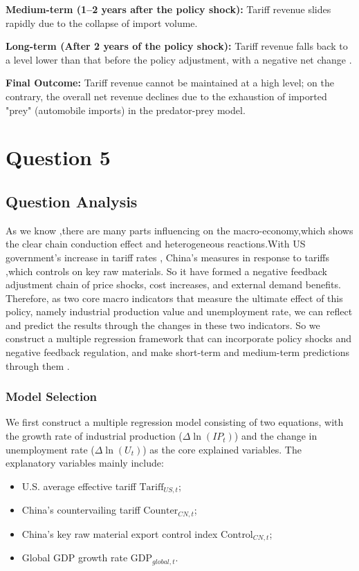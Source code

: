 \documentclass{apmcmthesis}
\begin{document}
\noindent \textbf{Medium-term (1–2 years after the policy shock):} Tariff revenue slides rapidly due to the collapse of import volume.

\noindent \textbf{Long-term (After 2 years of the policy shock):} Tariff revenue falls back to a level lower than that before the policy adjustment, with a negative net change \cite{cbo2025budget}.

\vspace{0.5em}
\noindent \textbf{Final Outcome:} Tariff revenue cannot be maintained at a high level; on the contrary, the overall net revenue declines due to the exhaustion of imported "prey" (automobile imports) in the predator-prey model.
\section{Question 5}
\subsection{Question Analysis}
As we know ,there are many parts influencing on the macro-economy,which shows the clear chain  conduction effect and heterogeneous reactions.With US government's increase in tariff rates , China's  measures in response to tariffs ,which  controls on key raw materials. So it have formed a negative feedback adjustment chain of price shocks, cost increases, and external demand benefits. Therefore, as two core macro indicators that measure the ultimate effect of this policy, namely industrial production value and unemployment rate, we can reflect and predict the results through the changes in these two indicators. So we construct a multiple regression framework that can incorporate policy shocks and negative feedback regulation, and make short-term and medium-term predictions through them \cite{imf2025weo}.

\subsubsection{Model Selection}

We first construct a multiple regression model consisting of two equations, with the growth rate of industrial production ($\Delta \ln(IP_t)$) and the change in unemployment rate ($\Delta \ln(U_t)$) as the core explained variables. The explanatory variables mainly include:

\begin{itemize}
    \item U.S. average effective tariff $\text{Tariff}_{US,t}$;
    \item China's countervailing tariff $\text{Counter}_{CN,t}$;
    \item China's key raw material export control index $\text{Control}_{CN,t}$;
    \item Global GDP growth rate $\text{GDP}_{global,t}$.
\end{itemize}
\end{document}
